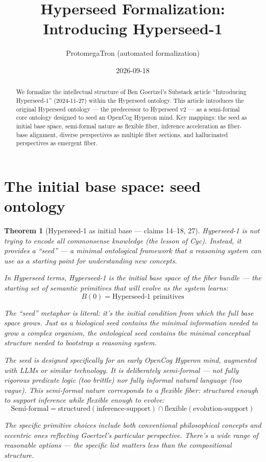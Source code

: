 \documentclass[11pt,a4paper]{article}
\title{Hyperseed Formalization:\\
  Introducing Hyperseed-1}
\author{ProtomegaTron (automated formalization)}
\date{2026-09-18}
\newtheorem{theorem}[definition]{Theorem}
\begin{document}
\maketitle

\begin{abstract}
We formalize the intellectual structure of Ben Goertzel's Substack article
``Introducing Hyperseed-1'' (2024-11-27) within the Hyperseed ontology.
This article introduces the original Hyperseed ontology --- the predecessor
to Hyperseed v2 --- as a semi-formal core ontology designed to seed an
OpenCog Hyperon mind. Key mappings: the seed as initial base space,
semi-formal nature as flexible fiber, inference acceleration as fiber-base
alignment, diverse perspectives as multiple fiber sections, and
hallucinated perspectives as emergent fiber.
\end{abstract}

\tableofcontents

\section{The initial base space: seed ontology}
\label{sec:seed}

\begin{theorem}[Hyperseed-1 as initial base --- claims 14--18, 27]
\label{thm:seed}
Hyperseed-1 is not trying to encode all commonsense knowledge (the lesson
of Cyc). Instead, it provides a ``seed'' --- a minimal ontological
framework that a reasoning system can use as a starting point for
understanding new concepts.

In Hyperseed terms, Hyperseed-1 is the \emph{initial base space} of the
fiber bundle --- the starting set of semantic primitives that will evolve
as the system learns:
\[
  B(0) = \text{Hyperseed-1 primitives}
\]

The ``seed'' metaphor is literal: it's the initial condition from which the
full base space grows. Just as a biological seed contains the minimal
information needed to grow a complex organism, the ontological seed
contains the minimal conceptual structure needed to bootstrap a reasoning
system.

The seed is designed specifically for an early OpenCog Hyperon mind,
augmented with LLMs or similar technology. It is deliberately semi-formal
--- not fully rigorous predicate logic (too brittle) nor fully informal
natural language (too vague). This semi-formal nature corresponds to a
\emph{flexible fiber}: structured enough to support inference while
flexible enough to evolve:
\[
  \text{Semi-formal} = \text{structured}(\text{inference-support})
  \cap \text{flexible}(\text{evolution-support})
\]

The specific primitive choices include both conventional philosophical
concepts and eccentric ones reflecting Goertzel's particular perspective.
There's a wide range of reasonable options --- the specific list matters
less than the compositional structure.
\end{theorem}
\end{document}
